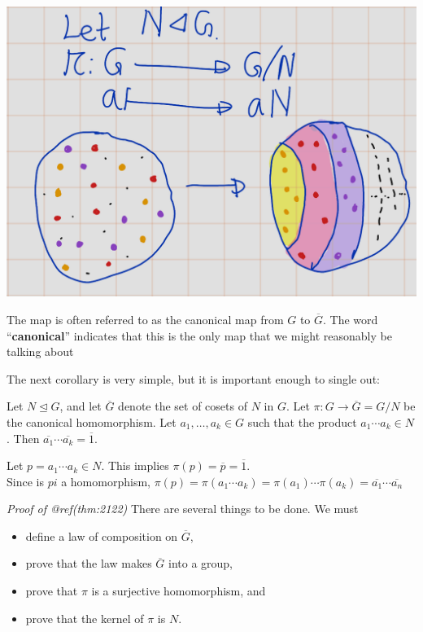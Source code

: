 \documentclass[
]{book}
\providecommand{\tightlist}{%
  \setlength{\itemsep}{0pt}\setlength{\parskip}{0pt}}
\begin{document}
\includegraphics{figures/ch_2/fig29.png}

The map is often referred to as the canonical map from \(G\) to
\(\overline{G}\). The word ``\textbf{canonical}'' indicates that this is
the only map that we might reasonably be talking about

The next corollary is very simple, but it is important enough to single
out:

\leavevmode{}%
Let \(N \trianglelefteq G\), and let \(\overline{G}\) denote the set of
cosets of \(N\) in \(G\). Let \(\pi: G \to \overline{G}=G/N\) be the
canonical homomorphism. Let \(a_1, \ldots, a_k\in G\) such that the
product \(a_1 \cdots a_k\in N\). Then
\(\overline{a_1} \cdots \overline{a_k} = \overline{1}\).

Let \(p=a_1 \cdots a_k\in N\). This implies
\(\pi(p)=\overline{p}=\overline{1}\).\\
Since is \(pi\) a homomorphism,
\(\pi(p)=\pi(a_1 \cdots a_k)=\pi(a_1)\cdots \pi(a_k)=\overline{a_1}\cdots\overline{a_n}\)

\emph{Proof of @ref(thm:2122)} There are several things to be done. We
must

\begin{itemize}
\tightlist
\item
  define a law of composition on \(\overline{G}\),
\item
  prove that the law makes \(\overline{G}\) into a group,
\item
  prove that \(\pi\) is a surjective homomorphism, and
\item
  prove that the kernel of \(\pi\) is \(N\).
\end{itemize}
\end{document}
